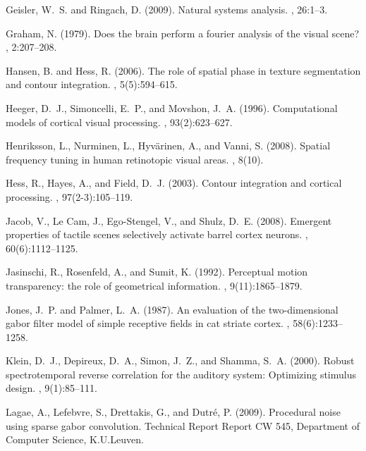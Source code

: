 \documentclass[a4paper,11pt]{article}%
\begin{document}
\begin{thebibliography}{}
Geisler, W.~S. and Ringach, D. (2009).
\newblock Natural systems analysis.
, 26:1--3.

Graham, N. (1979).
\newblock Does the brain perform a fourier analysis of the visual scene?
, 2:207--208.

Hansen, B. and Hess, R. (2006).
\newblock The role of spatial phase in texture segmentation and contour
  integration.
, 5(5):594--615.

Heeger, D.~J., Simoncelli, E.~P., and Movshon, J.~A. (1996).
\newblock Computational models of cortical visual processing.
, 93(2):623--627.

Henriksson, L., Nurminen, L., Hyv{\"a}rinen, A., and Vanni, S. (2008).
\newblock Spatial frequency tuning in human retinotopic visual areas.
, 8(10).

Hess, R., Hayes, A., and Field, D.~J. (2003).
\newblock Contour integration and cortical processing.
, 97(2-3):105--119.

Jacob, V., {Le Cam}, J., Ego-Stengel, V., and Shulz, D.~E. (2008).
\newblock Emergent properties of tactile scenes selectively activate barrel
  cortex neurons.
, 60(6):1112--1125.

Jasinschi, R., Rosenfeld, A., and Sumit, K. (1992).
\newblock Perceptual motion transparency: the role of geometrical information.
, 9(11):1865--1879.

Jones, J.~P. and Palmer, L.~A. (1987).
\newblock An evaluation of the two-dimensional gabor filter model of simple
  receptive fields in cat striate cortex.
, 58(6):1233--1258.

Klein, D.~J., Depireux, D.~A., Simon, J.~Z., and Shamma, S.~A. (2000).
\newblock Robust spectrotemporal reverse correlation for the auditory system:
  Optimizing stimulus design.
, 9(1):85--111.

Lagae, A., Lefebvre, S., Drettakis, G., and Dutr{\'e}, P. (2009).
\newblock Procedural noise using sparse gabor convolution.
\newblock Technical Report Report CW 545, Department of Computer Science,
  K.U.Leuven.


\end{thebibliography}
\end{document}
